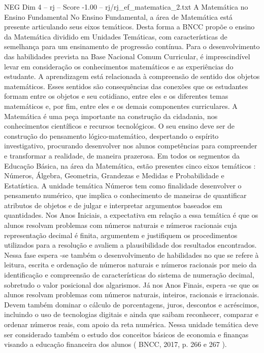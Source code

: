 \begin{textsample}{NEG Dim 4 – rj – Score -1.00 – rj/rj\_ef\_matematica\_2.txt}  \label{ex:f4_neg_123}
A Matemática no Ensino Fundamental No Ensino Fundamental, a área de Matemática está presente articulando seus eixos temáticos.
Desta forma a BNCC propõe o ensino da Matemática dividido em Unidades Temáticas, com características de semelhança para um ensinamento de progressão contínua.
Para o desenvolvimento das habilidades prevista na Base Nacional Comum Curricular, é imprescindível levar em consideração os conhecimentos matemáticos e as experiências do estudante.
A aprendizagem está relacionada à compreensão de sentido dos objetos matemáticos.
Esses sentidos são consequências das conexões que os estudantes formam entre os objetos e seu cotidiano, entre eles e os diferentes temas matemáticos e, por fim, entre eles e os demais componentes curriculares.
A Matemática é uma peça importante na construção da cidadania, nos conhecimentos científicos e recursos tecnológicos.
O seu ensino deve ser de construção do pensamento lógico-matemático, despertando o espírito investigativo, procurando desenvolver nos alunos competências para compreender e transformar a realidade, de maneira prazerosa.
Em todos os segmentos da Educação Básica, na área da Matemática, estão presentes cinco eixos temáticos : Números, Álgebra, Geometria, Grandezas e Medidas e Probabilidade e Estatística.
A unidade temática Números tem como finalidade desenvolver o pensamento numérico, que implica o conhecimento de maneiras de quantificar atributos de objetos e de julgar e interpretar argumentos baseados em quantidades.
Nos Anos Iniciais, a expectativa em relação a essa temática é que os alunos resolvam problemas com números naturais e números racionais cuja representação decimal é finita, argumentem e justifiquem os procedimentos utilizados para a resolução e avaliem a plausibilidade dos resultados encontrados.
Nessa fase espera -se também o desenvolvimento de habilidades no que se refere à leitura, escrita e ordenação de números naturais e números racionais por meio da identificação e compreensão de características do sistema de numeração decimal, sobretudo o valor posicional dos algarismos.
Já nos Anos Finais, espera -se que os alunos resolvam problemas com números naturais, inteiros, racionais e irracionais.
Devem também dominar o cálculo de porcentagens, juros, descontos e acréscimos, incluindo o uso de tecnologias digitais e ainda que saibam reconhecer, comparar e ordenar números reais, com apoio da reta numérica.
Nessa unidade temática deve ser considerado também o estudo dos conceitos básicos de economia e finanças visando a educação financeira dos alunos ( BNCC, 2017, p. 266 e 267 ).

\end{textsample}
